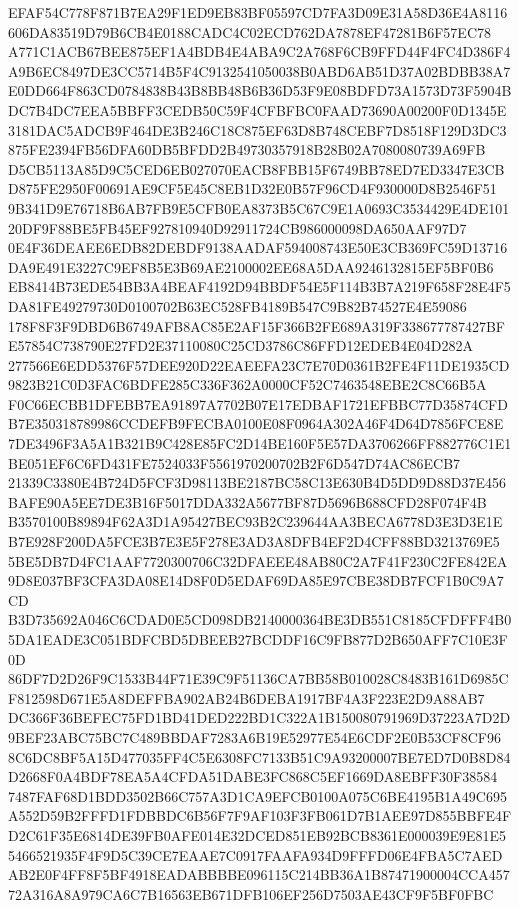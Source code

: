 \documentclass[UTF8,fontset=fandol,zihao=-4,a4paper]{ctexart}
\begin{document}
{{EFAF54C778F871B7EA29F1ED9EB83BF05597CD7FA3D09E31A58D36E4A8116606DA83519D79B6CB4E0188CADC4C02ECD762DA7878EF47281B6F57EC78
A771C1ACB67BEE875EF1A4BDB4E4ABA9C2A768F6CB9FFD44F4FC4D386F4A9B6EC8497DE3CC5714B5F4C9132541050038B0ABD6AB51D37A02BDBB38A7
E0DD664F863CD0784838B43B8BB48B6B36D53F9E08BDFD73A1573D73F5904BDC7B4DC7EEA5BBFF3CEDB50C59F4CFBFBC0FAAD73690A00200F0D1345E
3181DAC5ADCB9F464DE3B246C18C875EF63D8B748CEBF7D8518F129D3DC3875FE2394FB56DFA60DB5BFDD2B49730357918B28B02A7080080739A69FB
D5CB5113A85D9C5CED6EB027070EACB8FBB15F6749BB78ED7ED3347E3CBD875FE2950F00691AE9CF5E45C8EB1D32E0B57F96CD4F930000D8B2546F51
9B341D9E76718B6AB7FB9E5CFB0EA8373B5C67C9E1A0693C3534429E4DE10120DF9F88BE5FB45EF927810940D92911724CB986000098DA650AAF97D7
0E4F36DEAEE6EDB82DEBDF9138AADAF594008743E50E3CB369FC59D13716DA9E491E3227C9EF8B5E3B69AE2100002EE68A5DAA9246132815EF5BF0B6
EB8414B73EDE54BB3A4BEAF4192D94BBDF54E5F114B3B7A219F658F28E4F5DA81FE49279730D0100702B63EC528FB4189B547C9B82B74527E4E59086
178F8F3F9DBD6B6749AFB8AC85E2AF15F366B2FE689A319F338677787427BFE57854C738790E27FD2E37110080C25CD3786C86FFD12EDEB4E04D282A
277566E6EDD5376F57DEE920D22EAEEFA23C7E70D0361B2FE4F11DE1935CD9823B21C0D3FAC6BDFE285C336F362A0000CF52C7463548EBE2C8C66B5A
F0C66ECBB1DFEBB7EA91897A7702B07E17EDBAF1721EFBBC77D35874CFDB7E350318789986CCDEFB9FECBA0100E08F0964A302A46F4D64D7856FCE8E
7DE3496F3A5A1B321B9C428E85FC2D14BE160F5E57DA3706266FF882776C1E1BE051EF6C6FD431FE7524033F5561970200702B2F6D547D74AC86ECB7
21339C3380E4B724D5FCF3D98113BE2187BC58C13E630B4D5DD9D88D37E456BAFE90A5EE7DE3B16F5017DDA332A5677BF87D5696B688CFD28F074F4B
B3570100B89894F62A3D1A95427BEC93B2C239644AA3BECA6778D3E3D3E1EB7E928F200DA5FCE3B7E3E5F278E3AD3A8DFB4EF2D4CFF88BD3213769E5
5BE5DB7D4FC1AAF7720300706C32DFAEEE48AB80C2A7F41F230C2FE842EA9D8E037BF3CFA3DA08E14D8F0D5EDAF69DA85E97CBE38DB7FCF1B0C9A7CD
B3D735692A046C6CDAD0E5CD098DB2140000364BE3DB551C8185CFDFFF4B05DA1EADE3C051BDFCBD5DBEEB27BCDDF16C9FB877D2B650AFF7C10E3F0D
86DF7D2D26F9C1533B44F71E39C9F51136CA7BB58B010028C8483B161D6985CF812598D671E5A8DEFFBA902AB24B6DEBA1917BF4A3F223E2D9A88AB7
DC366F36BEFEC75FD1BD41DED222BD1C322A1B150080791969D37223A7D2D9BEF23ABC75BC7C489BBDAF7283A6B19E52977E54E6CDF2E0B53CF8CF96
8C6DC8BF5A15D477035FF4C5E6308FC7133B51C9A93200007BE7ED7D0B8D84D2668F0A4BDF78EA5A4CFDA51DABE3FC868C5EF1669DA8EBFF30F38584
7487FAF68D1BDD3502B66C757A3D1CA9EFCB0100A075C6BE4195B1A49C695A552D59B2FFFD1FDBBDC6B56F7F9AF103F3FB061D7B1AEE97D855BBFE4F
D2C61F35E6814DE39FB0AFE014E32DCED851EB92BCB8361E000039E9E81E55466521935F4F9D5C39CE7EAAE7C0917FAAFA934D9FFFD06E4FBA5C7AED
AB2E0F4FF8F5BF4918EADABBBBE096115C214BB36A1B87471900004CCA45772A316A8A979CA6C7B16563EB671DFB106EF256D7503AE43CF9F5BF0FBC
}}
\end{document}
